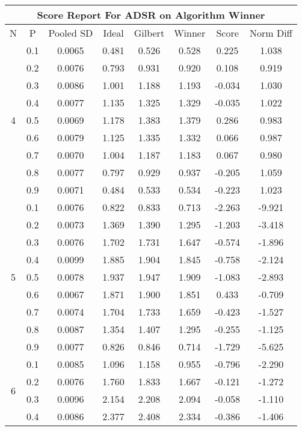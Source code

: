 \documentclass[11pt,a4paper]{report}
\begin{document}
\begin{longtable}{ | c | c || c | c | c | c | c | c | }
\hline
\multicolumn{8}{|c|}{ Score Report For ADSR on Algorithm Winner} \\
\hline
N & P & Pooled SD &  Ideal &  Gilbert & Winner  & Score & Norm Diff \\
 \hline
 \hline
 \endhead
\multirow{9}{*}{4} & 0.1 & 0.0065 & 0.481 & 0.526 & 0.528 & 0.225 & 1.038 \\
 & 0.2 & 0.0076 & 0.793 & 0.931 & 0.920 & 0.108 & 0.919 \\
 & 0.3 & 0.0086 & 1.001 & 1.188 & 1.193 & -0.034 & 1.030 \\
 & 0.4 & 0.0077 & 1.135 & 1.325 & 1.329 & -0.035 & 1.022 \\
 & 0.5 & 0.0069 & 1.178 & 1.383 & 1.379 & 0.286 & 0.983 \\
 & 0.6 & 0.0079 & 1.125 & 1.335 & 1.332 & 0.066 & 0.987 \\
 & 0.7 & 0.0070 & 1.004 & 1.187 & 1.183 & 0.067 & 0.980 \\
 & 0.8 & 0.0077 & 0.797 & 0.929 & 0.937 & -0.205 & 1.059 \\
 & 0.9 & 0.0071 & 0.484 & 0.533 & 0.534 & -0.223 & 1.023 \\
 \hline
\multirow{9}{*}{5} & 0.1 & 0.0076 & 0.822 & 0.833 & 0.713 & -2.263 & -9.921 \\
 & 0.2 & 0.0073 & 1.369 & 1.390 & 1.295 & -1.203 & -3.418 \\
 & 0.3 & 0.0076 & 1.702 & 1.731 & 1.647 & -0.574 & -1.896 \\
 & 0.4 & 0.0099 & 1.885 & 1.904 & 1.845 & -0.758 & -2.124 \\
 & 0.5 & 0.0078 & 1.937 & 1.947 & 1.909 & -1.083 & -2.893 \\
 & 0.6 & 0.0067 & 1.871 & 1.900 & 1.851 & 0.433 & -0.709 \\
 & 0.7 & 0.0074 & 1.704 & 1.733 & 1.659 & -0.423 & -1.527 \\
 & 0.8 & 0.0087 & 1.354 & 1.407 & 1.295 & -0.255 & -1.125 \\
 & 0.9 & 0.0077 & 0.826 & 0.846 & 0.714 & -1.729 & -5.625 \\
 \hline
\multirow{9}{*}{6} & 0.1 & 0.0085 & 1.096 & 1.158 & 0.955 & -0.796 & -2.290 \\
 & 0.2 & 0.0076 & 1.760 & 1.833 & 1.667 & -0.121 & -1.272 \\
 & 0.3 & 0.0096 & 2.154 & 2.208 & 2.094 & -0.058 & -1.110 \\
 & 0.4 & 0.0086 & 2.377 & 2.408 & 2.334 & -0.386 & -1.406 \\

\end{longtable}
\end{document}
